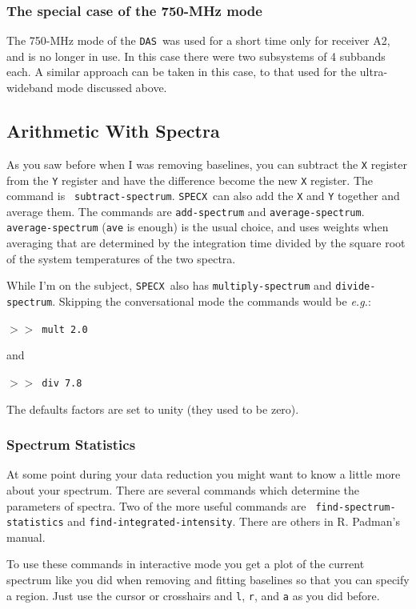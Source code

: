 \documentclass[11pt,twoside]{article}
\newcommand{\eg}{{\it e.g.}}
\newcommand{\SPECX}{{\tt SPECX}}
\newcommand{\das}{{\tt DAS}}
\newcommand{\SP}{{$>\!>$}}
\begin{document}
\subsubsection{The special case of the 750-MHz mode}
The 750-MHz mode of the \das\ was used for a short time only for
receiver A2, and is no longer in use. In this case there were two
subsystems of 4 subbands each. A similar approach can be taken in this
case, to that used for the ultra-wideband mode discussed above.

\subsection{Arithmetic With Spectra}
\label{sec:specx_8.1}

As you saw before when I was removing baselines, you can subtract the
{\tt X} register from the {\tt Y} register and have the difference
become the new {\tt X} register.  The command is {\tt
subtract-spectrum}.  \SPECX\ can also add the {\tt X} and {\tt Y}
together and average them.  The commands are {\tt add-spectrum} and
{\tt average-spectrum}.  {\tt average-spectrum} ({\tt{ave}} is enough)
is the usual choice, and uses weights when averaging that are
determined by the integration time divided by the square root of the
system temperatures of the two spectra.

While I'm on the subject, \SPECX\ also has {\tt multiply-spectrum} and
{\tt divide-spectrum}.  Skipping the conversational mode the commands
would be \eg :

\SP\ \verb|mult 2.0|

and

\SP\ \verb|div 7.8|

The defaults factors are set to unity (they used to be zero).

\subsubsection{Spectrum Statistics}
\label{sec:specx_10}
At some point during your data reduction you might want to know a little more
about your spectrum.  There are several commands which determine the
parameters of spectra.  Two of the more useful commands are {\tt
find-spectrum-statistics} and {\tt find-integrated-intensity}.  There are
others in R. Padman's manual.

To use these commands in interactive mode you get a plot of the
current spectrum like you did when removing and fitting baselines so
that you can specify a region.  Just use the cursor or crosshairs and
{\tt l}, {\tt r}, and {\tt a} as you did before.
\end{document}
